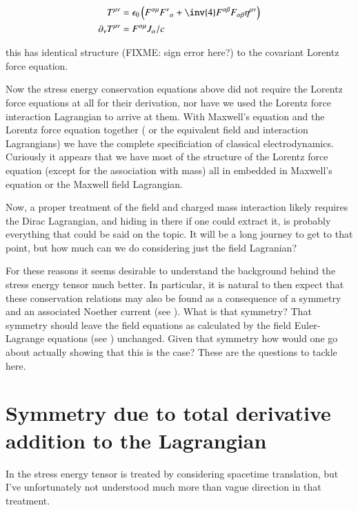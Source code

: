 \documentclass{article}
\begin{document}
\begin{align}
T^{\mu\nu} &= {\epsilon_0} \left( F^{\alpha\mu} {F^{\nu}}_{\alpha} + \inv{4} F^{\alpha\beta} F_{\alpha\beta} \eta^{\mu\nu} \right) \\
\partial_\nu T^{\mu\nu} &= F^{\alpha\mu} J_\alpha/c
\end{align}

this has identical structure (FIXME: sign error here?) to the
covariant Lorentz force equation.

Now the stress energy conservation equations above did not require
the Lorentz force equations at all for their derivation, nor have we
used the Lorentz force interaction Lagrangian to arrive at them.  
With Maxwell's equation and the Lorentz force equation together (
or the equivalent field and interaction Lagrangians) we have
the complete specificiation of classical electrodynamics.  Curiously
it
appears that we have most of the structure of the Lorentz force equation
(except for the association with mass) all in embedded in Maxwell's equation
or the Maxwell field Lagrangian.  

Now, a proper treatment of the field and charged mass interaction
likely requires the Dirac Lagrangian, and hiding in there if one
could extract it, is probably everything that could be said on the
topic.  It will be a long journey to get to that point, but how
much can we do considering just the field Lagranian?

For these reasons it seems desirable to
understand the background behind the stress energy tensor much better.
In particular, it is natural to then expect that these conservation
relations may also be found as a 
consequence of a symmetry and an associated Noether current
(see 
\cite{PJNoethersField}
).  What
is that symmetry?  That symmetry should leave the field equations as 
calculated by the field Euler-Lagrange equations (see
\cite{PJFieldLagrangian}
) unchanged.
Given that symmetry how would one go about
actually showing that this is the case?   These are the questions
to tackle here.

\section{ Symmetry due to total derivative addition to the Lagrangian }

In \cite{doran2003gap} the stress energy tensor is treated 
by considering spacetime translation, but I've unfortunately
not understood much more than vague direction in that treatment.
\end{document}
